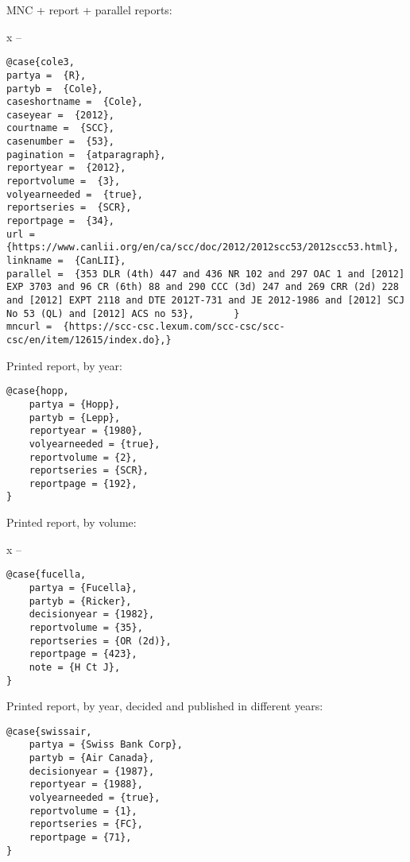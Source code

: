 \newpage
MNC + report + parallel reports: \par\bigskip
 \par
 x -- 
\begin{verbatim}
@case{cole3,	
partya =  {R},	
partyb =  {Cole},	
caseshortname =  {Cole},	
caseyear =  {2012},	
courtname =  {SCC},	
casenumber =  {53},	
pagination =  {atparagraph},	
reportyear =  {2012},	
reportvolume =  {3},	
volyearneeded =  {true},	
reportseries =  {SCR},	
reportpage =  {34},	
url =  {https://www.canlii.org/en/ca/scc/doc/2012/2012scc53/2012scc53.html},	
linkname =  {CanLII},		
parallel =  {353 DLR (4th) 447 and 436 NR 102 and 297 OAC 1 and [2012] EXP 3703 and 96 CR (6th) 88 and 290 CCC (3d) 247 and 269 CRR (2d) 228 and [2012] EXPT 2118 and DTE 2012T-731 and JE 2012-1986 and [2012] SCJ No 53 (QL) and [2012] ACS no 53},		}
mncurl =  {https://scc-csc.lexum.com/scc-csc/scc-csc/en/item/12615/index.do},}
\end{verbatim}


\newpage
Printed report, by year: \par\bigskip
\begin{verbatim}
@case{hopp,
	partya = {Hopp},
	partyb = {Lepp},
	reportyear = {1980},
	volyearneeded = {true},
	reportvolume = {2},
	reportseries = {SCR},
	reportpage = {192},
}
\end{verbatim}

\newpage
Printed report, by volume: \par\bigskip
 \par
 x -- 
\begin{verbatim}
@case{fucella,
	partya = {Fucella},
	partyb = {Ricker},
	decisionyear = {1982},
	reportvolume = {35},
	reportseries = {OR (2d)},
	reportpage = {423},
	note = {H Ct J},
}
\end{verbatim}

\newpage
Printed report, by year, decided and published in different years: \par\bigskip
{}
\begin{verbatim}
@case{swissair,
	partya = {Swiss Bank Corp},
	partyb = {Air Canada},
	decisionyear = {1987},
	reportyear = {1988},
	volyearneeded = {true},
	reportvolume = {1},
	reportseries = {FC},
	reportpage = {71},
}
\end{verbatim}

